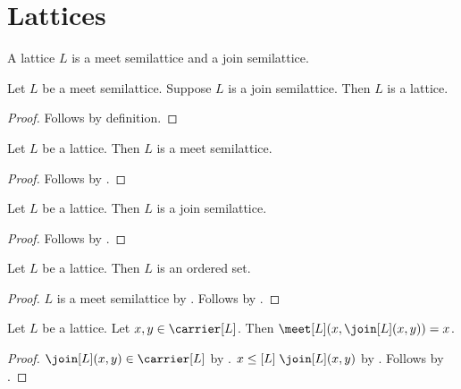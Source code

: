 \section{Lattices}





\begin{struct}\label{lattice}
    A lattice $L$ is a meet semilattice and a join semilattice.
\end{struct}

\begin{proposition}\label{lattice_intro}
    Let $L$ be a meet semilattice.
    Suppose $L$ is a join semilattice.
    Then $L$ is a lattice.
\end{proposition}
\begin{proof}
    Follows by definition.
\end{proof}

\begin{proposition}\label{lattice_is_meet_semilattice}
    Let $L$ be a lattice.
    Then $L$ is a meet semilattice.
\end{proposition}
\begin{proof}
    Follows by .
\end{proof}

\begin{proposition}\label{lattice_is_join_semilattice}
    Let $L$ be a lattice.
    Then $L$ is a join semilattice.
\end{proposition}
\begin{proof}
    Follows by .
\end{proof}

\begin{proposition}\label{lattice_is_ordered_set}
    Let $L$ be a lattice.
    Then $L$ is an ordered set.
\end{proposition}
\begin{proof}
    $L$ is a meet semilattice by .
    Follows by .
\end{proof}

\begin{proposition}\label{meet_join_absorption}
    Let $L$ be a lattice.
    Let $x,y\in\carrier[L]$.
    Then $\meet[L](x,\join[L](x,y))=x$.
\end{proposition}
\begin{proof}
    $\join[L](x,y)\in\carrier[L]$ by
        .
    $x\mathrel{\leq[L]}\join[L](x,y)$ by
        .
    Follows by
        .
\end{proof}

